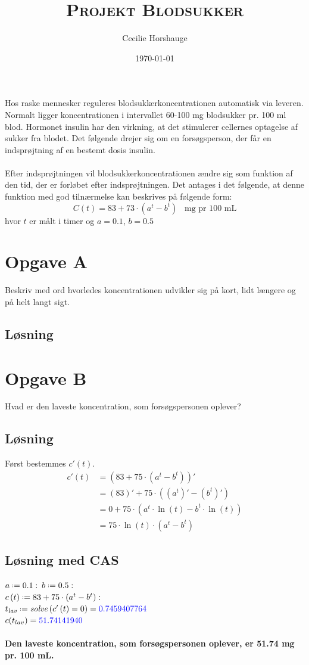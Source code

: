 \documentclass[a4paper, 11pt]{article}
\title{{\large \textsc{Projekt Blodsukker}}}
\author{Cecilie Horshauge}
\date{\today}
\newcommand*{\defeq}{\mathrel{\vcenter{\baselineskip0.5ex \lineskiplimit0pt
                     \hbox{\scriptsize.}\hbox{\scriptsize.}}}%
                     =}
\begin{document}
\maketitle
\noindent Hos raske mennesker reguleres blodsukkerkoncentrationen automatisk via leveren. 
Normalt ligger koncentrationen i intervallet 60-100 mg blodsukker pr. 100 ml blod. 
Hormonet insulin har den virkning, at det stimulerer cellernes optagelse af sukker fra blodet. 
Det følgende drejer sig om en forsøgsperson, der får en indsprøjtning af en bestemt dosis insulin.\\\\
Efter indsprøjtningen vil blodsukkerkoncentrationen ændre sig som funktion af den tid,
der er forløbet efter indsprøjtningen. Det antages i det følgende, at denne funktion med god tilnærmelse kan beskrives på følgende form: 
\[C(t)=83+73\cdot (a^t-b^t) \;\;\; \text{mg pr 100 mL}\]
hvor \(t\) er målt i timer og \(a=0.1\), \(b=0.5\)

\section*{Opgave A} 
Beskriv med ord hvorledes koncentrationen udvikler sig på kort, lidt længere og på helt langt sigt.

\subsection*{Løsning}

\section*{Opgave B} 
Hvad er den laveste koncentration, som forsøgspersonen oplever?
\subsection*{Løsning}
Først bestemmes \(c'(t)\).\\
\begin{align*}
    c'(t)&=(83+75 \cdot (a^t-b^t))'\\
    &= (83)'+ 75 \cdot ((a^t)'-(b^t)')\\
    &= 0+ 75 \cdot (a^t\cdot \ln(t)-b^t\cdot \ln(t))\\
    &= 75\cdot \ln(t)\cdot (a^t-b^t)
\end{align*}
\subsection*{Løsning med CAS}
\(a \defeq 0.1\, \colon\, b \defeq 0.5 \, \colon\)\\
\(c\left(t\right)\defeq 83+75\cdot \left(a^{t}-b^{t}\right)\colon\)\\
\(t_{\mathit{lav}}\defeq \mathit{solve}\left(c'\left(t\right)=0\right)=\textcolor{blue}{0.7459407764}\)\\
\(c(t_{lav})=\textcolor{blue}{51.74141940}\)\\\\
\textbf{Den laveste koncentration, som forsøgspersonen oplever, er 51.74 mg pr. 100 mL.}
\end{document}
